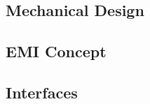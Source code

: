 \subsection{Mechanical Design}

\FloatBarrier
\subsection{EMI Concept}

\FloatBarrier
\subsection{Interfaces}

